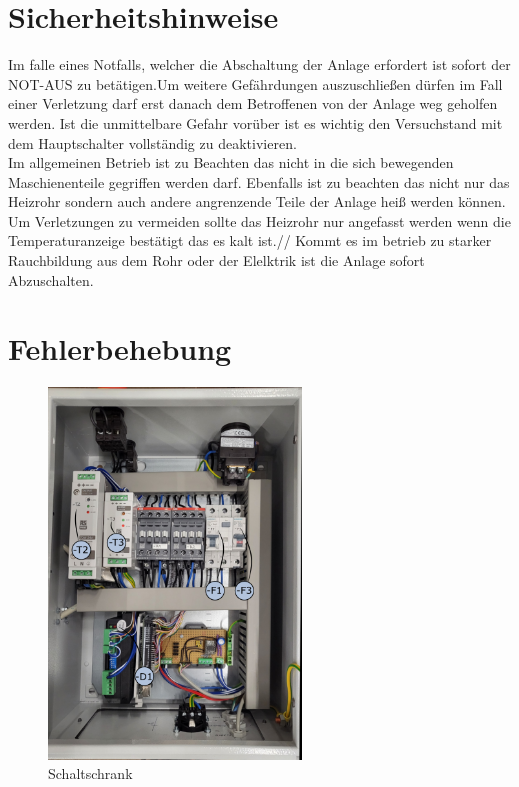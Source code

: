 \section{Sicherheitshinweise}
Im falle eines Notfalls, welcher die Abschaltung der Anlage erfordert ist sofort der NOT-AUS zu betätigen.Um weitere Gefährdungen auszuschließen dürfen im Fall einer Verletzung darf erst danach dem Betroffenen von der Anlage weg geholfen werden. Ist die unmittelbare Gefahr vorüber ist es wichtig den Versuchstand mit dem Hauptschalter vollständig zu deaktivieren. \\
Im allgemeinen Betrieb ist zu Beachten das nicht in die sich bewegenden Maschienenteile gegriffen werden darf. Ebenfalls ist zu beachten das nicht nur das Heizrohr sondern auch andere angrenzende Teile der Anlage heiß werden können. Um Verletzungen zu vermeiden sollte das Heizrohr nur angefasst werden wenn die Temperaturanzeige bestätigt das es kalt ist.//
Kommt es im betrieb zu starker Rauchbildung aus dem Rohr oder der Elelktrik ist die Anlage sofort Abzuschalten.

\newpage
\section{Fehlerbehebung}

\begin{figure}[!h]
    \centering
    \includegraphics[width=0.6\textwidth]{Abbildungen/Manuel/schrankinnen.png}
    \caption{Schaltschrank}
    \label{fig:schaltschrank}
\end{figure}


